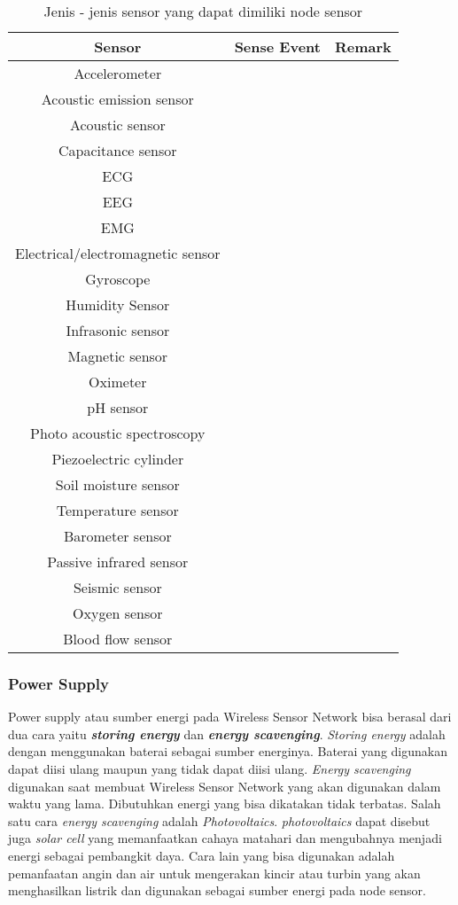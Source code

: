 \begin{table} [H]
	\centering 
	\caption{Jenis - jenis sensor yang dapat dimiliki node sensor}
	\label{tab:sensor}
	\begin{tabular}{|c|c|c|}
		\toprule
		Sensor & Sense Event & Remark\\

		\midrule
		Accelerometer & & \\
		Acoustic emission sensor &  & \\
		Acoustic sensor &  & \\
		Capacitance sensor &  & \\
		ECG &  & \\
		EEG &  & \\
		EMG &  & \\
		Electrical/electromagnetic sensor &  & \\
		Gyroscope &  & \\
		Humidity Sensor &  & \\
		Infrasonic sensor &  & \\
		Magnetic sensor &  & \\
		Oximeter &  & \\
		pH sensor &  & \\
		Photo acoustic spectroscopy &  & \\
		Piezoelectric cylinder  &  & \\
		Soil moisture sensor &  & \\
		Temperature sensor &  & \\
		Barometer sensor &  & \\
		Passive infrared sensor &  & \\
		Seismic sensor &  & \\
		Oxygen sensor &  & \\
		Blood flow sensor &  & \\

		\bottomrule
		
	\end{tabular} 
\end{table}

\subsubsection{Power Supply}
Power supply atau sumber energi pada Wireless Sensor Network bisa berasal dari dua cara yaitu \textbf{\textit{storing energy}} dan \textbf{\textit{energy scavenging}}. \textit{Storing energy} adalah dengan menggunakan baterai sebagai sumber energinya. Baterai yang digunakan dapat diisi ulang maupun yang tidak dapat diisi ulang. \textit{Energy scavenging} digunakan saat membuat Wireless Sensor Network yang akan digunakan dalam waktu yang lama. Dibutuhkan energi yang bisa dikatakan tidak terbatas. Salah satu cara \textit{energy scavenging} adalah \textit{Photovoltaics}. \textit{photovoltaics} dapat disebut juga \textit{solar cell} yang memanfaatkan cahaya matahari dan mengubahnya menjadi energi sebagai pembangkit daya. Cara lain yang bisa digunakan adalah pemanfaatan angin dan air untuk mengerakan kincir atau turbin yang akan menghasilkan listrik dan digunakan sebagai sumber energi pada node sensor.

